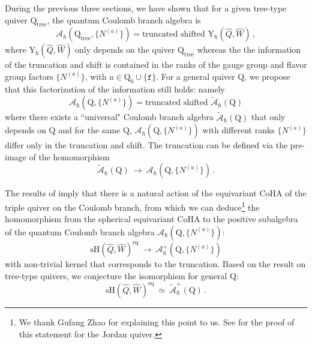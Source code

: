 \documentclass[12pt,a4paper]{article}
\renewcommand{\(}{\left(}
\renewcommand{\)}{\right)}
\renewcommand{\(}{\left(}
\renewcommand{\)}{\right)}
\begin{document}
During the previous three  sections, we have shown  that for a given tree-type quiver $\mathrm{Q}_{\textrm{tree}}$, the quantum Coulomb branch algebra is 
\begin{equation}
\mathcal{A}_{\hbar}(\mathrm{Q}_{\textrm{tree}}, \{N^{(a)}\}) = \textrm{truncated shifted Y}_{\hbar} (\widehat{Q},\widehat{W})   \,,
\end{equation}
where Y$_{\hbar}(\widehat{Q},\widehat{W})$ only depends on the quiver $\mathrm{Q}_{\textrm{tree}}$ whereas the 
the information of the truncation and shift is contained in the ranks of the gauge group and flavor group factors $\{N^{(a)}\}$, with $a\in \mathrm{Q}_0\cup \{\mathtt{f}\}$.
For a general quiver $\mathrm{Q}$, we propose that this factorization of the information still holds: namely
\begin{equation}
\mathcal{A}_{\hbar}(\mathrm{Q},\{N^{(a)}\})=\textrm{truncated shifted }\tilde{\mathcal{A}}_{\hbar}(\mathrm{Q})   
\end{equation}
where there exists a ``universal" Coulomb branch algebra $\tilde{\mathcal{A}}_{\hbar}(\mathrm{Q})$ that only depends on $\mathrm{Q}$ and for the same $\mathrm{Q}$, $\mathcal{A}_{\hbar}(\mathrm{Q},\{N^{(a)}\})$ with different ranks $\{N^{(a)}\}$ differ only in the truncation and shift.
The truncation can be defined via the pre-image of the homomorphism 
\begin{equation}
\tilde{\mathcal{A}}_{\hbar}(\mathrm{Q}) 
\ \rightarrow \
\mathcal{A}_{\hbar}(\mathrm{Q},\{N^{(a)}\})\,.
\end{equation}



\medskip

The results of \cite[Theorem 6.6]{Nakajima:2015txa} imply that there is a natural action of the equivariant CoHA of the triple quiver on the Coulomb branch, from which we can deduce\footnote{We thank Gufang Zhao for explaining this point to us. See \cite{Rapcak:2020ueh} for the proof of this statement for the Jordan quiver.} 
the homomorphism from the spherical equivariant CoHA to the positive subalgebra of the quantum Coulomb branch algebra $\mathcal{A}_{\hbar}(\mathrm{Q},\{N^{(a)}\})$:
\begin{equation}
\mathrm{sH}(\widehat{Q},\widehat{W})^{\textrm{eq}} 
\ \rightarrow \
\mathcal{A}_{\hbar}^{+} (\mathrm{Q},\{N^{(a)}\})\end{equation}
with non-trivial kernel that corresponds to the truncation.
Based on the result on tree-type quivers, we conjecture the isomorphism for general $\mathrm{Q}$:
\begin{equation}
\mathrm{sH}(\widehat{Q},\widehat{W})^{\textrm{eq}} 
\ \simeq \
\tilde{\mathcal{A}}_{\hbar}^{+} (\mathrm{Q})  \,.
\end{equation}
\end{document}

